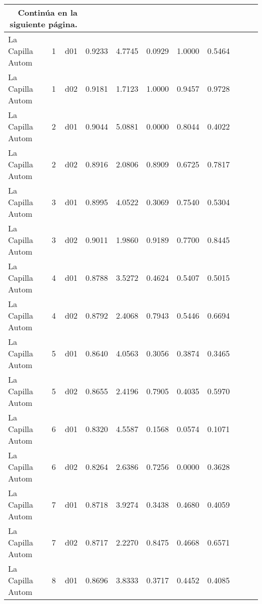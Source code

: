 \begin{landscape}
\begin{longtable}{p{2cm}rrrrrrrrrr}
\midrule
\endhead
\midrule
\multicolumn{3}{r}{{Continúa en la siguiente página.}} \\
\midrule
\endfoot

\bottomrule
\endlastfoot

        La Capilla Autom  &          1 &     d01 &   0.9233 &  4.7745 &        0.0929 &           1.0000 &  0.5464 \\
        La Capilla Autom  &          1 &     d02 &   0.9181 &  1.7123 &        1.0000 &           0.9457 &  0.9728 \\
        La Capilla Autom  &          2 &     d01 &   0.9044 &  5.0881 &        0.0000 &           0.8044 &  0.4022 \\
        La Capilla Autom  &          2 &     d02 &   0.8916 &  2.0806 &        0.8909 &           0.6725 &  0.7817 \\
        La Capilla Autom  &          3 &     d01 &   0.8995 &  4.0522 &        0.3069 &           0.7540 &  0.5304 \\
        La Capilla Autom  &          3 &     d02 &   0.9011 &  1.9860 &        0.9189 &           0.7700 &  0.8445 \\
        La Capilla Autom  &          4 &     d01 &   0.8788 &  3.5272 &        0.4624 &           0.5407 &  0.5015 \\
        La Capilla Autom  &          4 &     d02 &   0.8792 &  2.4068 &        0.7943 &           0.5446 &  0.6694 \\
        La Capilla Autom  &          5 &     d01 &   0.8640 &  4.0563 &        0.3056 &           0.3874 &  0.3465 \\
        La Capilla Autom  &          5 &     d02 &   0.8655 &  2.4196 &        0.7905 &           0.4035 &  0.5970 \\
        La Capilla Autom  &          6 &     d01 &   0.8320 &  4.5587 &        0.1568 &           0.0574 &  0.1071 \\
        La Capilla Autom  &          6 &     d02 &   0.8264 &  2.6386 &        0.7256 &           0.0000 &  0.3628 \\
        La Capilla Autom  &          7 &     d01 &   0.8718 &  3.9274 &        0.3438 &           0.4680 &  0.4059 \\
        La Capilla Autom  &          7 &     d02 &   0.8717 &  2.2270 &        0.8475 &           0.4668 &  0.6571 \\
        La Capilla Autom  &          8 &     d01 &   0.8696 &  3.8333 &        0.3717 &           0.4452 &  0.4085 \\

\end{longtable}
\end{landscape}
